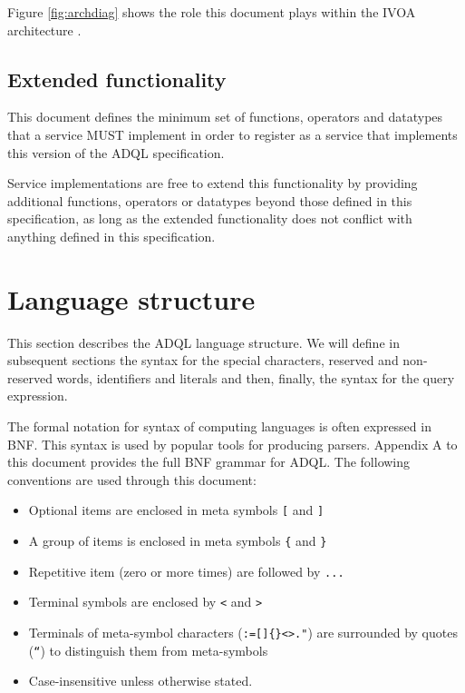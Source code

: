 \documentclass[11pt,a4paper]{ivoa}
\begin{document}
Figure \ref{fig:archdiag} shows the role this document plays within the
IVOA architecture \citep{note:VOARCH}.

\subsection{Extended functionality}
\label{sec:extending}

This document defines the minimum set of functions, operators and datatypes
that a service MUST implement in order to register as a service that
implements this version of the ADQL specification.

Service implementations are free to extend this functionality by providing
additional functions, operators or datatypes beyond those defined in this
specification, as long as the extended functionality does not conflict
with anything defined in this specification.
\clearpage
\section{Language structure}
\label{sec:language}

This section describes the ADQL language structure. We will define in
subsequent sections the syntax for the special characters, reserved and non-
reserved words, identifiers and literals and then, finally, the syntax for
the query expression.

The formal notation for syntax of computing languages is often expressed
in BNF. This syntax is used by popular tools for
producing parsers. Appendix A to this document provides the full BNF grammar
for ADQL. The following conventions are used through this document:

\begin{itemize}
    \item Optional items are enclosed in meta symbols \verb:[: and \verb:]:
    \item A group of items is enclosed in meta symbols \verb:{: and \verb:}:
    \item Repetitive item (zero or more times) are followed by \verb:...:
    \item Terminal symbols are enclosed by \verb:<: and \verb:>:
    \item Terminals of meta-symbol characters (\verb!:=[]{}<>."!) are surrounded by quotes (\verb:“:) to distinguish them from meta-symbols
    \item Case-insensitive unless otherwise stated.
\end{itemize}
\end{document}
